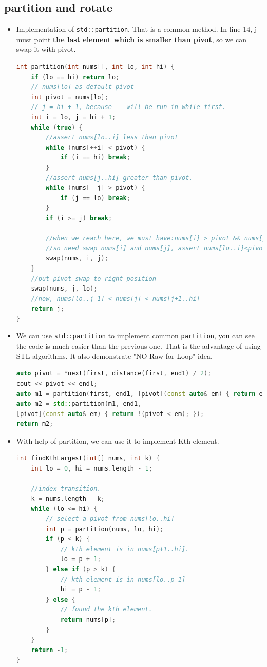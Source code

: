 \documentclass[a4paper,11pt,twoside]{book}
\begin{document}
\subsection{partition and rotate}
\begin{itemize}
		\item Implementation of \texttt{std::partition}. That is a common method.  In line 14, j must point \textbf{the last element which is smaller than pivot}, so we can swap it with pivot. 
\begin{lstlisting}[frame=single, language=c++]	
int partition(int nums[], int lo, int hi) {
	if (lo == hi) return lo;
	// nums[lo] as default pivot
	int pivot = nums[lo];
	// j = hi + 1, because -- will be run in while first.
	int i = lo, j = hi + 1;
	while (true) {
		//assert nums[lo..i] less than pivot
		while (nums[++i] < pivot) {
			if (i == hi) break;
		}
		//assert nums[j..hi] greater than pivot.
		while (nums[--j] > pivot) {
			if (j == lo) break;
		}
		if (i >= j) break;

		//when we reach here, we must have:nums[i] > pivot && nums[j] < pivot
		//so need swap nums[i] and nums[j], assert nums[lo..i]<pivot< nums[j..hi]
		swap(nums, i, j);
	}
	//put pivot swap to right position
	swap(nums, j, lo);
	//now, nums[lo..j-1] < nums[j] < nums[j+1..hi]
	return j;
}
\end{lstlisting}

		\item We can use \texttt{std::partition} to implement common \texttt{partition}, you can see the code is much easier than the previous one. That is the advantage of using STL algorithms. It also demonstrate "NO Raw for Loop" idea. 
\begin{lstlisting}[frame=single, language=c++]	
auto pivot = *next(first, distance(first, end1) / 2);
cout << pivot << endl;
auto m1 = partition(first, end1, [pivot](const auto& em) { return em < pivot; });
auto m2 = std::partition(m1, end1,
[pivot](const auto& em) { return !(pivot < em); });	
return m2;
\end{lstlisting}


	\item With help of partition, we can use it to implement Kth element. 
\begin{lstlisting}[frame=single, language=c++]	
int findKthLargest(int[] nums, int k) {
	int lo = 0, hi = nums.length - 1;

	//index transition.
	k = nums.length - k;
	while (lo <= hi) {
		// select a pivot from nums[lo..hi] 
		int p = partition(nums, lo, hi);
		if (p < k) {
			// kth element is in nums[p+1..hi].
			lo = p + 1;
		} else if (p > k) {
			// kth element is in nums[lo..p-1]
			hi = p - 1;
		} else {
			// found the kth element.
			return nums[p];
		}
	}
	return -1;
}
\end{lstlisting}	


\end{itemize}
\end{document}
